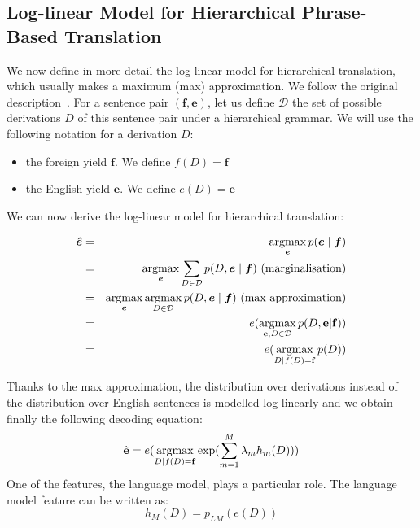     \subsection{Log-linear Model for Hierarchical Phrase-Based Translation} \label{sec:loglinear}

    We now define in more detail the log-linear model for hierarchical translation, which usually makes a maximum (max) approximation.
    We follow the original description~\citep{chiang:2007:CL}.
    For a sentence pair $(\bm{f}, \bm{e})$, let us define $\mathcal{D}$ the set of possible derivations $D$ of this sentence pair under 
    a hierarchical grammar. We will use the following notation for a derivation $D$:
    
    \begin{itemize}
      \item the foreign yield $\bm{f}$. We define $f(D) = \bm{f}$
      \item the English yield $\bm{e}$. We define $e(D) = \bm{e}$
    \end{itemize}

    We can now derive the log-linear model for hierarchical translation:

    \begin{eqnarray}
      \bm{\hat{e}} &=& \operatorname*{argmax}_{\bm{e}} p(\bm{e} \mid \bm{f}) \nonumber \\
                    &=& \operatorname*{argmax}_{\bm{e}} \sum_{D \in \mathcal{D}} p(D,\bm{e} \mid \bm{f}) \mbox{ (marginalisation)} \nonumber \\
                    &=& \operatorname*{argmax}_{\bm{e}} \operatorname*{argmax}_{D \in \mathcal{D}} p(D,\bm{e} \mid \bm{f}) \mbox{ (max approximation)} \nonumber \\
                    &=& e(\operatorname*{argmax}_{{\bf e},D \in \mathcal{D}} p(D,{\bf e}|{\bf f})) \nonumber \\
                    &=& e(\operatorname*{argmax}_{D | f(D) = {\bf f}} p(D))
    \end{eqnarray}

    Thanks to the max approximation, the distribution over derivations instead of the distribution over English
    sentences is modelled log-linearly and we obtain finally the following decoding equation:
%
    \begin{equation} \label{eq:decoding}
      \hat{{\bf e}} = e(\operatorname*{argmax}_{D | f(D) = {\bf f}} \exp(\sum_{m=1}^M \lambda_m h_m(D)))
    \end{equation}
%
    One of the features, the language model, plays a particular role. The language model feature can be written as:
%    
    \begin{equation}
      h_M(D) = p_{LM}(e(D))
    \end{equation}
    
